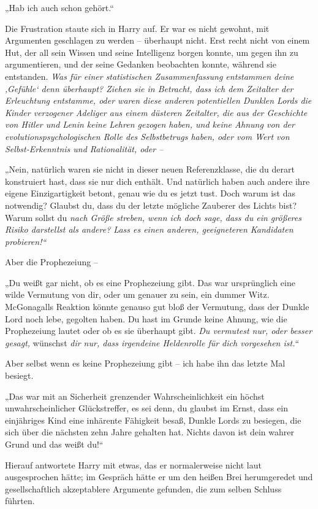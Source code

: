 {„Hab ich auch schon gehört.“

Die Frustration staute sich in Harry auf. Er war es nicht gewohnt, mit Argumenten geschlagen zu werden -- überhaupt nicht. Erst recht nicht von einem Hut, der all sein Wissen und seine Intelligenz borgen konnte, um gegen ihn zu argumentieren, und der seine Gedanken beobachten konnte, während sie entstanden. \emph{Was für einer statistischen Zusammenfassung entstammen deine ‚Gefühle` denn überhaupt? Ziehen sie in Betracht, dass ich dem Zeitalter der Erleuchtung entstamme, oder waren diese anderen potentiellen Dunklen Lords die Kinder verzogener Adeliger aus einem düsteren Zeitalter, die aus der Geschichte von Hitler und Lenin keine Lehren gezogen haben, und keine Ahnung von der evolutionspsychologischen Rolle des Selbstbetrugs haben, oder vom Wert von Selbst-Erkenntnis und Rationalität, oder --}

„Nein, natürlich waren sie nicht in dieser neuen Referenzklasse, die du derart konstruiert hast, dass sie nur dich enthält. Und natürlich haben auch andere ihre eigene Einzigartigkeit betont, genau wie du es jetzt tust. Doch warum ist das notwendig? Glaubst du, dass du der letzte mögliche Zauberer des Lichts bist? Warum sollst du \emph{nach Größe streben, wenn ich doch sage, dass du ein größeres Risiko darstellst als andere? Lass es einen anderen, geeigneteren Kandidaten probieren!“}

Aber die Prophezeiung --

„Du weißt gar nicht, ob es eine Prophezeiung gibt. Das war ursprünglich eine wilde Vermutung von dir, oder um genauer zu sein, ein dummer Witz. McGonagalls Reaktion könnte genauso gut bloß der Vermutung, dass der Dunkle Lord noch lebe, gegolten haben. Du hast im Grunde keine Ahnung, wie die Prophezeiung lautet oder ob es sie überhaupt gibt. \emph{Du vermutest nur, oder besser gesagt,} wünschst \emph{dir nur, dass irgendeine Heldenrolle für dich vorgesehen ist.“}

Aber selbst wenn es keine Prophezeiung gibt -- ich habe ihn das letzte Mal besiegt.

„Das war mit an Sicherheit grenzender Wahrscheinlichkeit ein höchst unwahrscheinlicher Glückstreffer, es sei denn, du glaubst im Ernst, dass ein einjähriges Kind eine inhärente Fähigkeit besaß, Dunkle Lords zu besiegen, die sich über die nächsten zehn Jahre gehalten hat. Nichts davon ist dein wahrer Grund und das weißt du!“

Hierauf antwortete Harry mit etwas, das er normalerweise nicht laut ausgesprochen hätte; im Gespräch hätte er um den heißen Brei herumgeredet und gesellschaftlich akzeptablere Argumente gefunden, die zum selben Schluss führten.

}
